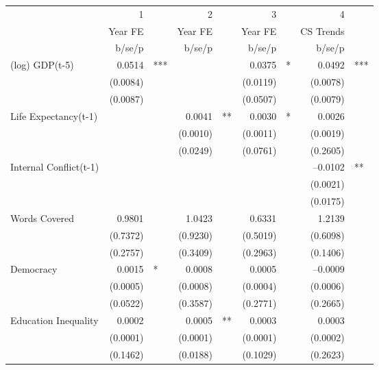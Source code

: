 \begin{tabular} {l* {4}{r @{} l}}
\hline
            &           1&   &           2&   &           3&   &           4&   \\
            &     Year FE&   &     Year FE&   &     Year FE&   &   CS Trends&   \\
            &      b/se/p&   &      b/se/p&   &      b/se/p&   &      b/se/p&   \\
\hline
(log) GDP(t-5)&      0.0514&***&            &   &      0.0375&*  &      0.0492&***\\
            &    (0.0084)&   &            &   &    (0.0119)&   &    (0.0078)&   \\
            &    (0.0087)&   &            &   &    (0.0507)&   &    (0.0079)&   \\
Life Expectancy(t-1) &            &   &      0.0041&** &      0.0030&*  &      0.0026&   \\
            &            &   &    (0.0010)&   &    (0.0011)&   &    (0.0019)&   \\
            &            &   &    (0.0249)&   &    (0.0761)&   &    (0.2605)&   \\
Internal Conflict(t-1)&            &   &            &   &            &   &    --0.0102&** \\
            &            &   &            &   &            &   &    (0.0021)&   \\
            &            &   &            &   &            &   &    (0.0175)&   \\
Words Covered&      0.9801&   &      1.0423&   &      0.6331&   &      1.2139&   \\
            &    (0.7372)&   &    (0.9230)&   &    (0.5019)&   &    (0.6098)&   \\
            &    (0.2757)&   &    (0.3409)&   &    (0.2963)&   &    (0.1406)&   \\
Democracy   &      0.0015&*  &      0.0008&   &      0.0005&   &    --0.0009&   \\
            &    (0.0005)&   &    (0.0008)&   &    (0.0004)&   &    (0.0006)&   \\
            &    (0.0522)&   &    (0.3587)&   &    (0.2771)&   &    (0.2665)&   \\
Education Inequality&      0.0002&   &      0.0005&** &      0.0003&   &      0.0003&   \\
            &    (0.0001)&   &    (0.0001)&   &    (0.0001)&   &    (0.0002)&   \\
            &    (0.1462)&   &    (0.0188)&   &    (0.1029)&   &    (0.2623)&   \\

\end{tabular}
